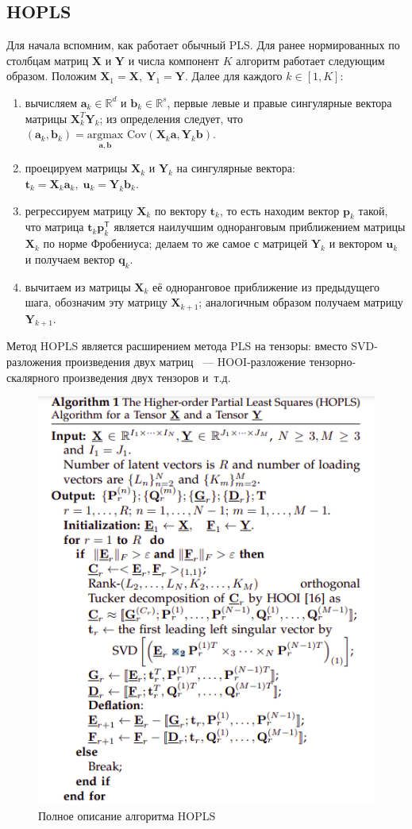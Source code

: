 \documentclass[a4paper,14pt]{article}
\newcommand{\T}{^{\mathsf{T}}}
\newcommand{\dR}{\mathbb{R}}
\newcommand{\ba}{\mathbf{a}}
\newcommand{\bb}{\mathbf{b}}
\newcommand{\bp}{\mathbf{p}}
\newcommand{\bq}{\mathbf{q}}
\newcommand{\bt}{\mathbf{t}}
\newcommand{\bu}{\mathbf{u}}
\newcommand{\bX}{\mathbf{X}}
\newcommand{\bY}{\mathbf{Y}}
\theoremstyle{plain} %
\theoremstyle{definition} %
\theoremstyle{remark} %
\begin{document}
	\subsection{HOPLS}
	Для начала вспомним, как работает обычный PLS.  
	Для ранее нормированных по столбцам матриц $\bX$ и $\bY$ и числа компонент $K$ алгоритм работает следующим образом. 
	Положим $\bX_1 = \bX, \: \bY_1 = \bY$. 
	Далее для каждого $k \in [1, K]$:
	\begin{enumerate}
		\item вычисляем $\ba_k \in \dR^d$ и $\bb_k \in \dR^s$, первые левые и правые сингулярные вектора матрицы $\bX_k^T \bY_k$; из определения следует, что $(\ba_k, \bb_k) = \underset{\ba, \bb}{\text{argmax}} \text{ Cov} (\bX_k \ba, \bY_k \bb)$.
		\item проецируем матрицы $\bX_k$ и $\bY_k$ на сингулярные вектора: $\bt_k = \bX_k \ba_k, \; \bu_k = \bY_k \bb_k$.
		\item регрессируем матрицу $\bX_k$ по вектору $\bt_k$, то есть находим вектор $\bp_k$ такой, что матрица $\bt_k \bp_k\T$ является наилучшим одноранговым приближением матрицы $\bX_k$ по норме Фробениуса; делаем то же самое с матрицей $\bY_k$ и вектором $\bu_k$ и получаем вектор $\bq_k$.
		\item вычитаем из матрицы $\bX_k$ её одноранговое приближение из предыдущего шага, обозначим эту матрицу $\bX_{k+1}$; аналогичным образом получаем матрицу $\bY_{k+1}$.
	\end{enumerate}

	Метод HOPLS является расширением метода PLS на тензоры: вместо SVD-разложения произведения двух матриц ~--- HOOI-разложение тензорно-скалярного произведения двух тензоров и~т.д. 

	\begin{figure}[bhtp]
		\centering
		\includegraphics[width=0.8\linewidth]{hopls_algo.png}
		\caption{Полное описание алгоритма HOPLS}
	\end{figure}
\end{document}
